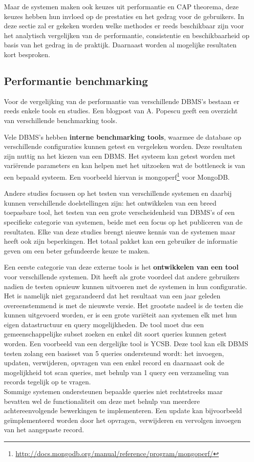 Maar de systemen maken ook keuzes uit performantie en CAP theorema, deze keuzes hebben hun invloed op de prestaties en het gedrag voor de gebruikers. In deze sectie zal er gekeken worden welke methodes er reeds beschikbaar zijn voor het analytisch vergelijken van de performantie, consistentie en beschikbaarheid op basis van het gedrag in de praktijk. Daarnaast worden al mogelijke resultaten kort besproken.   

\subsection{Performantie benchmarking}
Voor de vergelijking van de performantie van verschillende DBMS's bestaan er reeds enkele tools en studies. Een blogpost van A. Popescu \cite{PopescuBenchmarkOverview} geeft een overzicht van verschillende benchmarking tools. 

Vele DBMS's hebben \textbf{interne benchmarking tools}, waarmee de database op verschillende configuraties kunnen getest en vergeleken worden. Deze resultaten zijn nuttig na het kiezen van een DBMS. Het systeem kan getest worden met variërende parameters en kan helpen met het uitzoeken wat de bottleneck is van een bepaald systeem. Een voorbeeld hiervan is mongoperf\footnote{\url{http://docs.mongodb.org/manual/reference/program/mongoperf/}} voor MongoDB. 

Andere studies focussen op het testen van verschillende systemen en daarbij kunnen verschillende doelstellingen zijn: het ontwikkelen van een breed toepasbare tool, het testen van een grote verscheidenheid van DBMS's of een specifieke categorie van systemen, beide met een focus op het publiceren van de resultaten. Elke van deze studies brengt nieuwe kennis van de systemen maar heeft ook zijn beperkingen. Het totaal pakket kan een gebruiker de informatie geven om een beter gefundeerde keuze te maken. 

Een eerste categorie van deze externe tools is het \textbf{ontwikkelen van een tool} voor verschillende systemen. Dit heeft als grote voordeel dat andere gebruikers nadien de testen opnieuw kunnen uitvoeren met de systemen in hun configuratie. Het is namelijk niet gegarandeerd dat het resultaat van een jaar geleden overeenstemmend is met de nieuwste versie.
Het grootste nadeel is de testen die kunnen uitgevoerd worden, er is een grote variëteit aan systemen elk met hun eigen datastructuur en query mogelijkheden. De tool moet dus een gemeenschappelijke subset zoeken en enkel dit soort queries kunnen getest worden. Een voorbeeld van een dergelijke tool is YCSB\cite{cooper2010benchmarking}. Deze tool kan elk DBMS testen zolang een basisset van 5 queries ondersteund wordt: het invoegen, updaten, verwijderen, opvragen van een enkel record en daarnaast ook de mogelijkheid tot scan queries, met behulp van 1 query een verzameling van records tegelijk op te vragen. \\
Sommige systemen ondersteunen bepaalde queries niet rechtstreeks maar bevatten wel de functionaliteit om deze met behulp van meerdere achtereenvolgende bewerkingen te implementeren. Een update kan bijvoorbeeld geïmplementeerd worden door het opvragen, verwijderen en vervolgen invoegen van het aangepaste record. 

